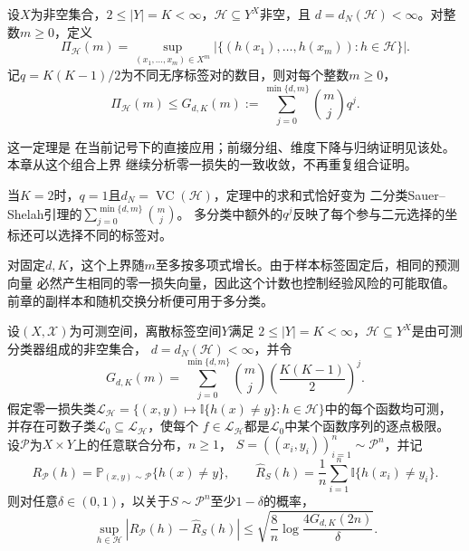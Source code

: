 \begin{theorem}[有限标签的预测数目上界]
\label{thm:learning-multiclass-growth-bound}
设$X$为非空集合，$2\leq|Y|=K<\infty$，$\mathcal H\subseteq Y^X$非空，且
$d=d_N(\mathcal H)<\infty$。对整数$m\geq0$，定义
\[
 \Pi_{\mathcal H}(m)
 =\sup_{(x_1,\ldots,x_m)\in X^m}
 \left|\{(h(x_1),\ldots,h(x_m)):h\in\mathcal H\}\right|.
\]
记$q=K(K-1)/2$为不同无序标签对的数目，则对每个整数$m\geq0$，
\[
 \Pi_{\mathcal H}(m)\leq G_{d,K}(m)
 :=\sum_{j=0}^{\min\{d,m\}}\binom mj q^j.
\]
\end{theorem}

这一定理是
在当前记号下的直接应用；前缀分组、维度下降与归纳证明见该处。本章从这个组合上界
继续分析零一损失的一致收敛，不再重复组合证明。

当$K=2$时，$q=1$且$d_N=\operatorname{VC}(\mathcal H)$，定理中的求和式恰好变为
二分类Sauer--Shelah引理的$\sum_{j=0}^{\min\{d,m\}}\binom mj$。
多分类中额外的$q^j$反映了每个参与二元选择的坐标还可以选择不同的标签对。

对固定$d,K$，这个上界随$m$至多按多项式增长。由于样本标签固定后，相同的预测向量
必然产生相同的零一损失向量，因此这个计数也控制经验风险的可能取值。
前章的副样本和随机交换分析便可用于多分类。

\begingroup
{}
\begin{theorem}[有限标签的一致收敛保证]
\label{thm:finite-label-uniform-convergence}
设$(X,\mathcal X)$为可测空间，离散标签空间$Y$满足
$2\leq|Y|=K<\infty$，$\mathcal H\subseteq Y^X$是由可测分类器组成的非空集合，
$d=d_N(\mathcal H)<\infty$，并令
\[
 G_{d,K}(m)=\sum_{j=0}^{\min\{d,m\}}\binom mj
 \left(\frac{K(K-1)}2\right)^j.
\]
假定零一损失类$\mathcal L_{\mathcal H}
=\{(x,y)\mapsto\mathbb I\{h(x)\neq y\}:h\in\mathcal H\}$中的每个函数均可测，
并存在可数子类$\mathcal L_0\subseteq\mathcal L_{\mathcal H}$，使每个
$f\in\mathcal L_{\mathcal H}$都是$\mathcal L_0$中某个函数序列的逐点极限。
设$\mathcal P$为$X\times Y$上的任意联合分布，$n\geq1$，
$S=((x_i,y_i))_{i=1}^n\sim\mathcal P^n$，并记
\[
 R_{\mathcal P}(h)=\mathbb P_{(x,y)\sim\mathcal P}\{h(x)\neq y\},\qquad
 \hat R_S(h)=\frac1n\sum_{i=1}^n\mathbb I\{h(x_i)\neq y_i\}.
\]
则对任意$\delta\in(0,1)$，以关于$S\sim\mathcal P^n$至少$1-\delta$的概率，
\begin{equation}
 \sup_{h\in\mathcal H}|R_{\mathcal P}(h)-\hat R_S(h)|
 \leq\sqrt{\frac8n\log\frac{4G_{d,K}(2n)}{\delta}}.
 \label{eq:finite-label-uniform-bound}
\end{equation}
\end{theorem}
\endgroup


